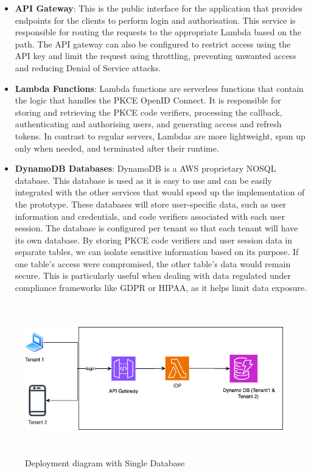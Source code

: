 \begin{itemize}
    \item \textbf{API Gateway}: This is the public interface for the application that provides endpoints for the clients to perform login and authorisation. This service is responsible for routing the requests to the appropriate Lambda based on the path. The API gateway can also be configured to restrict access using the API key and limit the request using throttling, preventing unwanted access and reducing Denial of Service attacks.
    \item \textbf{Lambda Functions}: Lambda functions are serverless functions that contain the logic that handles the PKCE OpenID Connect. It is responsible for storing and retrieving the PKCE code verifiers, processing the callback, authenticating and authorising users, and generating access and refresh tokens. In contrast to regular servers, Lambdas are more lightweight, spun up only when needed, and terminated after their runtime.
    \item \textbf{DynamoDB Databases}: DynamoDB is a AWS proprietary NOSQL database. This database is used as it is easy to use and can be easily integrated with the other services that would speed up the implementation of the prototype. These databases will store user-specific data, such as user information and credentials, and code verifiers associated with each user session. The database is configured per tenant so that each tenant will have its own database. By storing PKCE code verifiers and user session data in separate tables, we can isolate sensitive information based on its purpose. If one table’s access were compromised, the other table’s data would remain secure. This is particularly useful when dealing with data regulated under compliance frameworks like GDPR or HIPAA, as it helps limit data exposure.

\end{itemize}


\begin{figure}[h!]
\centering
\caption{Deployment diagram with Single Database}\label{fig:deployment_diagram_single}
\includegraphics[width=\textwidth, height=250px]{pics/deployment_diagram_single.png}
\end{figure}

